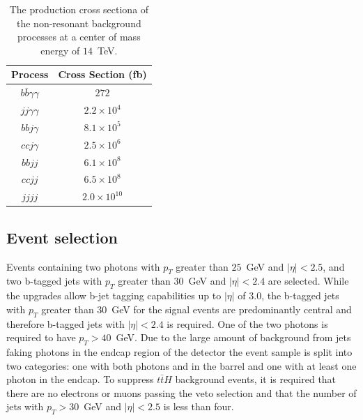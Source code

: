 \begin{table}[!ht]
\begin{center} 
\begin{tabular}{|c|c|}
\hline
Process                                           &   Cross Section (fb)   \\ \hline
$b \bar{b} \gamma\gamma$                          &   $272$                            \\
$jj \gamma\gamma$                                 &   $2.2 \times 10^{4}$              \\
$bb j\gamma$                                      &   $8.1 \times 10^{5}$              \\
$cc j\gamma$                                      &   $2.5 \times 10^{6}$              \\
$bb jj$                                           &   $6.1 \times 10^{8}$              \\
$cc jj$                                           &   $6.5 \times 10^{8}$              \\
$jjjj$                                            &   $2.0 \times 10^{10}$             \\ \hline
\end{tabular}
\caption{ The production cross sectiona of the non-resonant background processes at a center of mass energy 
of $14$~TeV.}
\label{tab:CrossSections}
\end{center}
\end{table}

\subsection{Event selection}
\label{sec:eventselection}
 
Events containing two photons with $p_{T}$ greater than $25$~GeV
and $|\eta|<2.5$, and two b-tagged jets with $p_{T}$ greater than $30$~GeV and $|\eta|<2.4$ are selected. While the \phasetwo upgrades allow b-jet tagging capabilities up to $|\eta|$ of $3.0$, the b-tagged jets with $p_{T}$ greater than $30$~GeV for the signal events are predominantly central and therefore b-tagged jets with $|\eta|<2.4$ is required. One of the two photons is required to have $p_{T} > 40$~GeV. Due to the large amount of background from jets faking photons in the endcap region of the detector the event sample is split into two categories: one with both photons and in the barrel and one with at least one photon in the endcap. To suppress $t\bar{t}H$ background events, it is required that there are no electrons or muons passing the veto selection and that  the number of jets with $p_{T}>30$~GeV and $|\eta|<2.5$ is less than four. 

